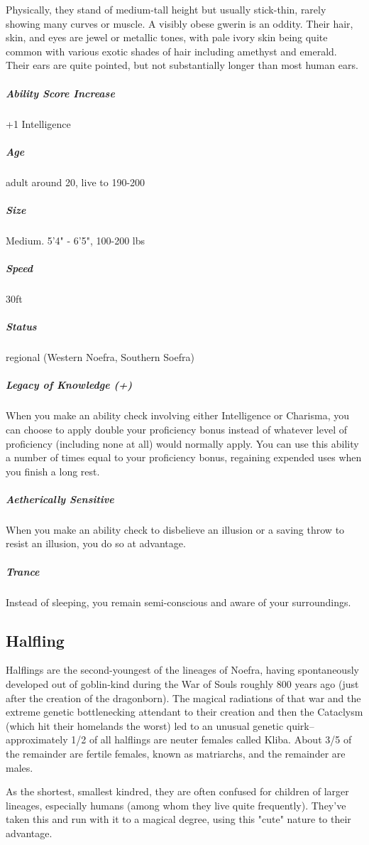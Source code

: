 Physically, they stand of medium-tall height but usually stick-thin, rarely showing many curves or muscle. A visibly obese gwerin is an oddity. Their hair, skin, and eyes are jewel or metallic tones, with pale ivory skin being quite common with various exotic shades of hair including amethyst and emerald. Their ears are quite pointed, but not substantially longer than most human ears.

\subparagraph*{Ability Score Increase}  +1 Intelligence

\subparagraph*{Age}  adult around 20, live to 190-200

\subparagraph*{Size}  Medium. 5'4" - 6'5", 100-200 lbs

\subparagraph*{Speed}  30ft

\subparagraph*{Status}  regional (Western Noefra, Southern Soefra)

\subparagraph*{Legacy of Knowledge (+)}  When you make an ability check involving either Intelligence or Charisma, you can choose to apply double your proficiency bonus instead of whatever level of proficiency (including none at all) would normally apply. You can use this ability a number of times equal to your proficiency bonus, regaining expended uses when you finish a long rest.

\subparagraph*{Aetherically Sensitive}  When you make an ability check to disbelieve an illusion or a saving throw to resist an illusion, you do so at advantage.

\subparagraph*{Trance}  Instead of sleeping, you remain semi-conscious and aware of your surroundings.

\subsection{Halfling}\label{lineage:halfling}

Halflings are the second-youngest of the lineages of Noefra, having spontaneously developed out of goblin-kind during the War of Souls roughly 800 years ago (just after the creation of the dragonborn). The magical radiations of that war and the extreme genetic bottlenecking attendant to their creation and then the Cataclysm (which hit their homelands the worst) led to an unusual genetic quirk--approximately 1/2 of all halflings are neuter females called Kliba. About 3/5 of the remainder are fertile females, known as matriarchs, and the remainder are males.

As the shortest, smallest kindred, they are often confused for children of larger lineages, especially humans (among whom they live quite frequently). They've taken this and run with it to a magical degree, using this "cute" nature to their advantage.

